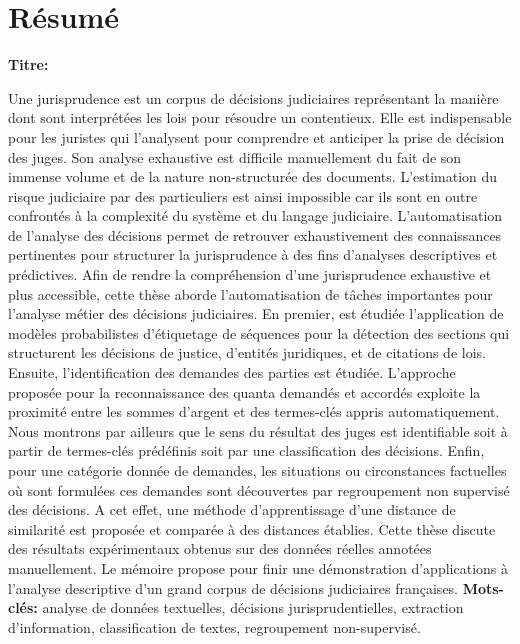 \chapter*{Résumé}
\textbf{Titre:} \textsc{\titlefr}

Une jurisprudence est un corpus de décisions judiciaires représentant la manière dont sont interprétées les lois pour résoudre un contentieux. Elle est indispensable pour les juristes qui l'analysent pour comprendre et anticiper la prise de décision des juges. Son analyse exhaustive est difficile manuellement du fait de son immense volume et de la nature non-structurée des documents. L'estimation du risque judiciaire par des particuliers est ainsi impossible car ils sont en outre confrontés à la complexité du système et du langage judiciaire. L'automatisation de l'analyse des décisions permet de retrouver exhaustivement des connaissances pertinentes pour structurer la jurisprudence à des fins d'analyses descriptives et prédictives. Afin de rendre la compréhension d'une jurisprudence exhaustive et plus accessible, cette thèse aborde l'automatisation de tâches importantes pour l'analyse métier des décisions judiciaires. En premier, est étudiée l'application de modèles probabilistes d'étiquetage de séquences pour la détection des sections qui structurent les décisions de justice, d'entités juridiques, et de citations de lois. Ensuite, l'identification des demandes des parties est étudiée. L'approche proposée pour la reconnaissance des quanta demandés et accordés exploite la proximité entre les sommes d'argent et des termes-clés appris automatiquement. Nous montrons par ailleurs que le sens du résultat des juges est identifiable soit à partir de termes-clés prédéfinis soit par une classification des décisions. Enfin, pour une catégorie donnée de demandes, les situations ou circonstances factuelles où sont formulées ces demandes sont découvertes par regroupement non supervisé des décisions. A cet effet, une méthode d'apprentissage d'une distance de similarité est proposée et comparée à des distances établies. Cette thèse discute des résultats expérimentaux obtenus sur des données réelles annotées manuellement. Le mémoire propose pour finir une démonstration d'applications à l'analyse descriptive d'un grand corpus de décisions judiciaires françaises.
\newline
\textbf{Mots-clés:} analyse de données textuelles, décisions jurisprudentielles, extraction d'information, classification de textes, regroupement non-supervisé.

